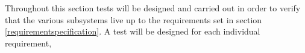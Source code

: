 
Throughout this section tests will be designed and carried out in order to verify that the various subsystems live up to the requirements set in section \ref{requirementspecification}.
A test will be designed for each individual requirement, 



